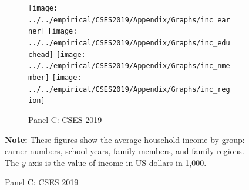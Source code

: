 \documentclass[11pt,letterpaper]{article}
\begin{document}
\begin{figure}[H]
\begin{subfigure}[b]{0.33\linewidth}
		\vspace{-2.5em}
		\newline {}
	\end{subfigure}
	\hfil
	\begin{subfigure}[b]{0.33\linewidth}
		\caption*{Panel C: CSES 2019} \vspace{-.5em}
		\label{fig:3c}
		\texttt{[image: ../../empirical/CSES2019/Appendix/Graphs/inc\_earner]} 
		\vspace{-2.5em}
		\newline {}
		\texttt{[image: ../../empirical/CSES2019/Appendix/Graphs/inc\_educhead]} 
		\vspace{-2.5em}
		\newline {}
		\texttt{[image: ../../empirical/CSES2019/Appendix/Graphs/inc\_nmember]} 
		\vspace{-2.5em}
		\newline {}
		\texttt{[image: ../../empirical/CSES2019/Appendix/Graphs/inc\_region]} 
		\vspace{-2.5em}
		\newline {}
	\end{subfigure}
	
	\begin{tablenotes}
		\footnotesize
		\item \textbf{Note:} These figures show the average household income by group: earner numbers, school years, family members, and family regions. The $y$ axis is the value of income in US dollars in 1,000. 
		
	\end{tablenotes} 
\end{figure}
\end{document}
